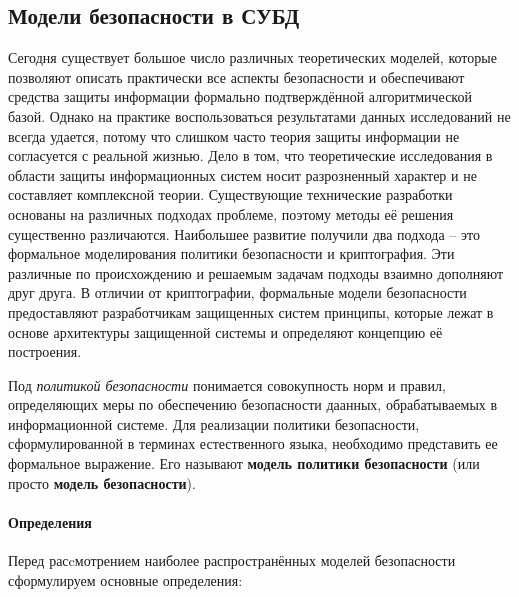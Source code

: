 \subsection{Модели безопасности в СУБД}

Сегодня существует большое число различных теоретических моделей, которые позволяют описать практически все аспекты безопасности и обеспечивают средства защиты информации формально подтверждённой алгоритмической базой. Однако на практике воспользоваться результатами данных исследований не всегда удается, потому что слишком часто теория защиты информации не согласуется с реальной жизнью. Дело в том, что теоретические исследования в области защиты информационных систем носит разрозненный характер и не составляет комплексной теории. Существующие технические разработки основаны на различных подходах проблеме, поэтому методы её решения существенно различаются. Наибольшее развитие получили два подхода -- это формальное моделирования политики безопасности и криптография. Эти различные по происхождению и решаемым задачам подходы взаимно дополняют друг друга. В отличии от криптографии, формальные модели безопасности предоставляют разработчикам защищенных систем принципы, которые лежат в основе архитектуры защищенной системы и определяют концепцию её построения.

Под \textit{политикой безопасности} понимается совокупность норм и правил, определяющих меры по обеспечению безопасности даанных, обрабатываемых в информационной системе.  Для реализации политики безопасности, сформулированной в терминах естест­венного языка, необходимо представить ее формальное выражение.  Его называют \textbf{модель политики безопасности} (или просто \textbf{модель безопасности}).

\paragraph{Определения}

Перед расcмотрением наиболее распространённых моделей безопасности сформулируем основные определения:

